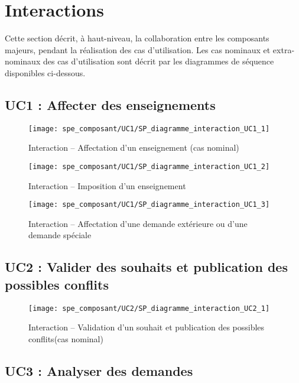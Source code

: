 \FloatBarrier
\section{Interactions}

    Cette section décrit, à haut-niveau, la collaboration entre les composants majeurs, pendant la réalisation des cas d'utilisation. Les cas nominaux et extra-nominaux des cas d'utilisation sont décrit par les diagrammes de séquence disponibles ci-dessous.
    
    \subsection{UC1 : Affecter des enseignements}
    
    \begin{figure}[h]
    	\centering
    	\texttt{[image: spe\_composant/UC1/SP\_diagramme\_interaction\_UC1\_1]}
    	\caption{Interaction \--- Affectation d'un enseignement (cas nominal)}
    	\label{fig:label}
    \end{figure}
    
    \begin{figure}[h]
    	\centering
    	\texttt{[image: spe\_composant/UC1/SP\_diagramme\_interaction\_UC1\_2]}
    	\caption{Interaction \--- Imposition d'un enseignement}
    	\label{fig:label}
    \end{figure}
    
    \begin{figure}[h]
    	\centering
    	\texttt{[image: spe\_composant/UC1/SP\_diagramme\_interaction\_UC1\_3]}
    	\caption{Interaction \--- Affectation d'une demande extérieure ou d'une demande spéciale}
    	\label{fig:label}
    \end{figure}
    
    \FloatBarrier
    \subsection{UC2 : Valider des souhaits et publication des possibles conflits}
    \begin{figure}[h]
    	\centering
    	\texttt{[image: spe\_composant/UC2/SP\_diagramme\_interaction\_UC2\_1]}
    	\caption{Interaction \--- Validation d'un souhait et publication des possibles conflits(cas nominal)}
    	\label{fig:label}
    \end{figure}
    
    \FloatBarrier
    \subsection{UC3 : Analyser des demandes}
    
